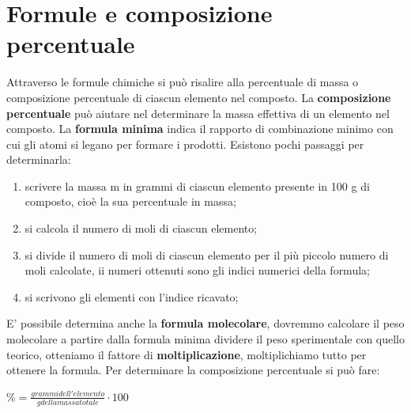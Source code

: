 \documentclass[11pt, a4paper, openright]{book}
\begin{document}
\section{Formule e composizione percentuale}
Attraverso le formule chimiche si può risalire alla percentuale di massa o composizione percentuale di ciascun elemento nel composto. 
La \textbf{composizione percentuale} può aiutare nel determinare la massa effettiva di un elemento nel composto.
La \textbf{formula minima} indica il rapporto di combinazione minimo con cui gli atomi si legano per formare i prodotti. Esistono pochi passaggi per determinarla:
\begin{enumerate}
    \item scrivere la massa m in grammi di ciascun elemento presente in 100 g di composto, cioè la sua percentuale in massa;
    \item si calcola il numero di moli di ciascun elemento;
    \item si divide il numero di moli di ciascun elemento per il più piccolo numero di moli calcolate, ii numeri ottenuti sono gli indici numerici della formula;
    \item si scrivono gli elementi con l'indice ricavato;
\end{enumerate}
E' possibile determina anche la \textbf{formula molecolare}, dovremmo calcolare il peso molecolare a partire dalla formula minima dividere il peso sperimentale con quello teorico, otteniamo il fattore di
\textbf{moltiplicazione}, moltiplichiamo tutto per ottenere la formula.
Per determinare la composizione percentuale si può fare:
\begin{center}
   \textbf{ $ \% = \frac{grammi dell'elemento}{g della massa totale} \cdot 100$}
\end{center}
\end{document}
